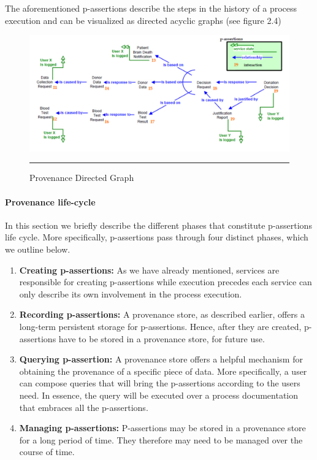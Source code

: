 The aforementioned p-assertions describe the steps in the history of a process execution and can be visualized as directed acyclic graphs (see figure 2.4)

\begin{figure}[htbp]
	\centering
		\includegraphics[scale=0.35]{./Figures/chapter2/figure4.pdf}
		\rule{35em}{0.5pt}
	\caption[Provenance Directed Graph]{Provenance Directed Graph\cite{reference9}}
	\label{fig:provGraph}
\end{figure}


\paragraph{Provenance life-cycle}

In this section we briefly describe the different phases that constitute p-assertions life cycle\cite{reference10}. More specifically, p-assertions pass through four distinct phases, which we outline below.
\begin{enumerate}
  \item
        \textbf{Creating p-assertions:} As we have already mentioned, services are responsible for creating p-assertions while execution precedes each service can only describe its own involvement in the process execution.
  \item
        \textbf{Recording p-assertions:} A provenance store, as described earlier, offers a long-term persistent storage for p-assertions. Hence, after they are created, p-assertions have to be stored in a provenance store, for future use.
  \item
        \textbf{Querying p-assertion:} A provenance store offers a helpful mechanism for obtaining the provenance of a specific piece of data. More specifically, a user can compose queries that will bring the p-assertions according to the users need. In essence, the query will be executed over a process documentation that embraces all the p-assertions.
  \item
        \textbf{Managing p-assertions:} P-assertions may be stored in a provenance store for a long period of time. They therefore may need to be managed over the course of time.
\end{enumerate}

